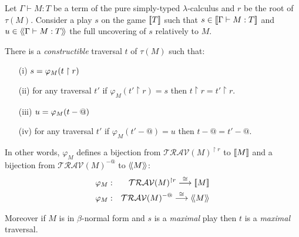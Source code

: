 \begin{prop}
\label{prop:rel_gamesem_redtrav_closed} Let $\Gamma \vdash M : T$ be
a term of the pure simply-typed $\lambda$-calculus and $r$ be
the root of $\tau(M)$.
Consider a play $s$ on the game ${[\![ T ]\!]}$ such that $s \in {[\![\Gamma \vdash M:T ]\!]}$
and $u \in {\langle\!\langle \Gamma \vdash M:T \rangle\!\rangle}$ the full uncovering of $s$ relatively to $M$.

There is a \emph{constructible} traversal $t$ of $\tau(M)$ such that:
\begin{itemize}
\item[(i)] $s =  \varphi_M (t \upharpoonright r ) $
\item[(ii)] for any traversal $t'$ if $\varphi_M (t' \upharpoonright r ) = s$ then $t\upharpoonright r = t'\upharpoonright r$.
\item[(iii)] $u =  \varphi_M (t - @)$
\item[(iv)] for any traversal $t'$ if $\varphi_M (t' - @ ) = u$ then $t-@ =t' -@$.
\end{itemize}


In other words, $\varphi_M$ defines a bijection from $\mathcal{TRAV}(M)^{\upharpoonright r}$ to ${[\![ M ]\!]}$ and
a bijection from $\mathcal{TRAV}(M)^{-@}$ to ${\langle\!\langle M \rangle\!\rangle}$:
\begin{eqnarray*}
 \varphi_M  &:& \mathcal{TRAV}(M)^{\upharpoonright r} \stackrel{\cong}{\longrightarrow} {[\![ M ]\!]} \\
 \varphi_M  &:& \mathcal{TRAV}(M)^{-@} \stackrel{\cong}{\longrightarrow} {\langle\!\langle M \rangle\!\rangle}
\end{eqnarray*}

Moreover if $M$ is in $\beta$-normal form and $s$ is a \emph{maximal} play then  $t$ is
a \emph{maximal} traversal.
\end{prop}


